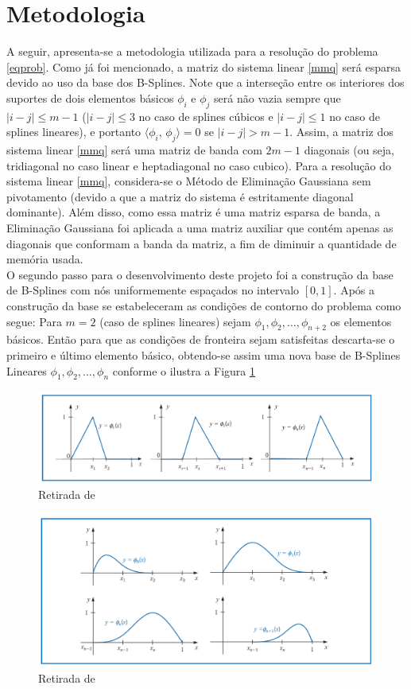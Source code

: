 \documentclass[12pt,a4paper]{report}
\begin{document}
\section*{Metodologia}
A seguir, apresenta-se a metodologia utilizada para a resolução do problema \eqref{eqprob}. Como já foi mencionado, a matriz do sistema linear \eqref{mmq} será esparsa devido ao uso da base dos B-Splines. Note que a interseção entre os interiores dos suportes de dois elementos básicos $\phi_i$ e $\phi_j$ será não vazia sempre que $|i-j|\leq m-1$ ($|i-j|\leq 3$ no caso de splines cúbicos e $|i-j|\leq 1$ no caso de splines lineares), e portanto $\langle \phi_i,\,\phi_j\rangle = 0$ se $|i-j|> m-1$. Assim, a matriz dos sistema linear \eqref{mmq} será uma matriz de banda com $2m-1$ diagonais (ou seja, tridiagonal no caso linear e heptadiagonal no caso cubico). Para a resolução do sistema linear \eqref{mmq}, considera-se o Método de Eliminação Gaussiana sem pivotamento (devido a que a matriz do sistema é estritamente diagonal dominante). Além disso, como essa matriz é uma matriz esparsa de banda, a Eliminação Gaussiana foi aplicada a uma matriz auxiliar que contém apenas as diagonais que conformam a banda da matriz, a fim de diminuir a quantidade de memória usada.\medskip\\
O segundo passo para o desenvolvimento deste projeto foi a construção da base de B-Splines com nós uniformemente espaçados no intervalo $[0,1]$.  Após a construção da base se estabeleceram as condições de contorno do problema como segue: Para $m=2$ (caso de splines lineares) sejam $\phi_1,\phi_2,\dots,\phi_{n+2}$ os elementos básicos. Então para que as condições de fronteira sejam satisfeitas descarta-se o primeiro e último elemento básico, obtendo-se assim uma nova base  de B-Splines Lineares $\phi_1,\phi_2,\dots,\phi_{n}$ conforme o ilustra a Figura \ref{splin}
\begin{figure}[htb]
\centering
\includegraphics[width=1.0\linewidth]{splin.png}
\caption{\label{splin}Retirada de \cite{bur}}
\end{figure}
\begin{figure}[htb]
\centering
\includegraphics[width=1.0\linewidth]{spcub.png}
\caption{\label{spcub}Retirada de \cite{bur}}
\end{figure}\\
\end{document}
